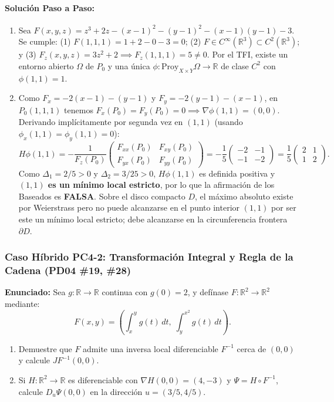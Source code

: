 \documentclass[11pt,a4paper]{article}
\begin{document}
\paragraph{Solución Paso a Paso:}
\begin{enumerate}[label=\textbf{\alph*)}]
  \item Sea $F(x,y,z) = z^3 + 2z - (x-1)^2 - (y-1)^2 - (x-1)(y-1) - 3$. Se cumple: (1) $F(1,1,1) = 1+2-0-3 = 0$; (2) $F \in C^\infty(\mathbb{R}^3) \subset C^2(\mathbb{R}^3)$; y (3) $F_z(x,y,z) = 3z^2+2 \implies F_z(1,1,1) = 5 \neq 0$. Por el TFI, existe un entorno abierto $\Omega$ de $P_0$ y una única $\phi: \text{Proy}_{X\times Y}\Omega \to \mathbb{R}$ de clase $C^2$ con $\phi(1,1)=1$.
  \item Como $F_x = -2(x-1)-(y-1)$ y $F_y = -2(y-1)-(x-1)$, en $P_0(1,1,1)$ tenemos $F_x(P_0)=F_y(P_0)=0 \implies \nabla\phi(1,1) = (0,0)$. Derivando implícitamente por segunda vez en $(1,1)$ (usando $\phi_x(1,1)=\phi_y(1,1)=0$):
  \[ H\phi(1,1) = -\frac{1}{F_z(P_0)} \begin{pmatrix} F_{xx}(P_0) & F_{xy}(P_0) \\ F_{yx}(P_0) & F_{yy}(P_0) \end{pmatrix} = -\frac{1}{5}\begin{pmatrix} -2 & -1 \\ -1 & -2 \end{pmatrix} = \frac{1}{5}\begin{pmatrix} 2 & 1 \\ 1 & 2 \end{pmatrix}. \]
  Como $\Delta_1 = 2/5 > 0$ y $\Delta_2 = 3/25 > 0$, $H\phi(1,1)$ es definida positiva y \textbf{$(1,1)$ es un mínimo local estricto}, por lo que la afirmación de los Baseados es \textbf{FALSA}. Sobre el disco compacto $D$, el máximo absoluto existe por Weierstrass pero no puede alcanzarse en el punto interior $(1,1)$ por ser este un mínimo local estricto; debe alcanzarse en la circunferencia frontera $\partial D$.
\end{enumerate}

\subsubsection*{Caso Híbrido PC4-2: Transformación Integral y Regla de la Cadena (PD04 \#19, \#28)}
\begin{tcolorbox}[colback=white,colframe=gray!40,arc=1mm,boxrule=0.5pt]
\textbf{Enunciado:} Sea $g: \mathbb{R} \to \mathbb{R}$ continua con $g(0) = 2$, y defínase $F: \mathbb{R}^2 \to \mathbb{R}^2$ mediante:
\[ F(x,y) = \left( \int_x^y g(t)\,dt, \; \int_y^{x^2} g(t)\,dt \right). \]
\begin{enumerate}[label=\textbf{\alph*)}]
  \item Demuestre que $F$ admite una inversa local diferenciable $F^{-1}$ cerca de $(0,0)$ y calcule $JF^{-1}(0,0)$.
  \item Si $H: \mathbb{R}^2 \to \mathbb{R}$ es diferenciable con $\nabla H(0,0) = (4, -3)$ y $\Psi = H \circ F^{-1}$, calcule $D_u \Psi(0,0)$ en la dirección $u = (3/5, 4/5)$.
\end{enumerate}
\end{tcolorbox}
\end{document}
